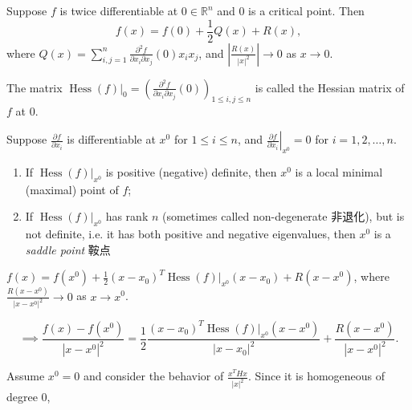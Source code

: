Suppose $f$ is twice differentiable at $0\in\mathbb{R}^n$ and $0$ is a critical point. Then
$$
    f(x)=f(0)+\frac{1}{2}Q(x)+R(x),
$$
where $Q(x)=\sum_{i,j=1}^n\frac{\partial^2f}{\partial x_i\partial x_j}(0)x_ix_j$, and $\left|\frac{R(x)}{|x|^2}\right|\to 0$ as $x\to 0$.

The matrix $\operatorname{Hess}(f)|_0=\left(\frac{\partial^2f}{\partial x_i\partial x_j}(0)\right)_{1\leq i,j\leq n}$ is called the Hessian matrix of $f$ at $0$.

\begin{theorem}
    Suppose $\frac{\partial f}{\partial x_i}$ is differentiable at $x^0$ for $1\leq i\leq n$, and $\left.\frac{\partial f}{\partial x_i}\right|_{x^0}=0$ for $i=1,2,\dots,n$.
    \begin{enumerate}
        \item If $\operatorname{Hess}(f)|_{x^0}$ is positive (negative) definite, then $x^0$ is a local minimal (maximal) point of $f$;
        \item If $\operatorname{Hess}(f)|_{x^0}$ has rank $n$ (sometimes called non-degenerate 非退化), but is not definite, i.e. it has both positive and negative eigenvalues, then $x^0$ is a \emph{saddle point} 鞍点
    \end{enumerate}
\end{theorem}

\begin{pf}
    $f(x)=f(x^0)+\frac{1}{2}(x-x_0)^T\operatorname{Hess}(f)|_{x^0}(x-x_0)+R(x-x^0)$, where $\frac{R(x-x^0)}{|x-x^0|^2}\to 0$ as $x\to x^0$.

    $$
        \implies\frac{f(x)-f(x^0)}{|x-x^0|^2}=\frac{1}{2}\frac{(x-x_0)^T\operatorname{Hess}(f)|_{x^0}(x-x^0)}{|x-x_0|^2}+\frac{R(x-x^0)}{|x-x^0|^2}.
    $$

    Assume $x^0=0$ and consider the behavior of $\frac{x^THx}{|x|^2}$. Since it is homogeneous of degree $0$,
\end{pf}

